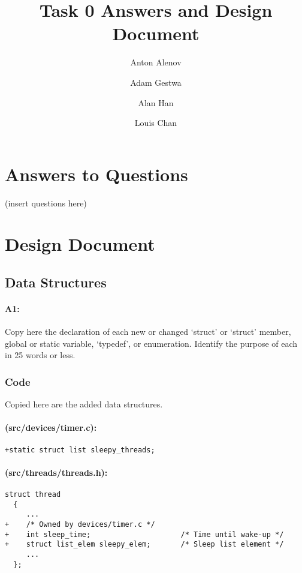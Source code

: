 \documentclass[11pt]{article}
\begin{document}
\title{Task 0 Answers and Design Document}
\author{Anton Alenov \and Adam Gestwa \and Alan Han \and Louis Chan}

\maketitle

\section{Answers to Questions}
(insert questions here)

\section{Design Document}

\subsection{Data Structures}
\paragraph{A1:}
Copy here the declaration of each new or changed ‘struct’ or ‘struct’ member, global or static variable, ‘typedef’, or enumeration. Identify the purpose of each in 25 words or less.
\subsubsection{Code}
Copied here are the added data structures.

\paragraph{(src/devices/timer.c):}

\begin{verbatim}
+static struct list sleepy_threads;
\end{verbatim}

\paragraph{(src/threads/threads.h):}

\begin{verbatim}
struct thread
  {
     ...
+    /* Owned by devices/timer.c */
+    int sleep_time;                     /* Time until wake-up */
+    struct list_elem sleepy_elem;       /* Sleep list element */
     ...
  };

\end{verbatim}
\end{document}
